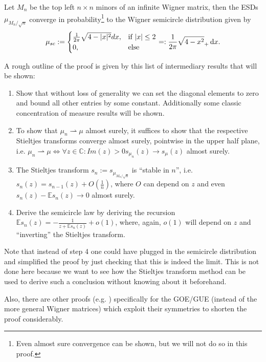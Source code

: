 \begin{theorem}\label{thm:semicircle}
	Let $M_n$ be the top left $n\times n$ minors of an infinite Wigner matrix, then the ESDs $\mu_{M_n/\sqrt{n}}$ converge in probability\footnote{Even almost sure convergence can be shown, but we will not do so in this proof.} to the Wigner semicircle distribution given by
	\begin{equation*}
		\mu_{sc}:=\begin{cases}
						\frac{1}{2\pi}\sqrt{4-|x|^2}dx, &\mbox{if } |x|\leq 2 \\
						0, &\mbox{else}
					  \end{cases}=:\frac{1}{2\pi}\sqrt{4-x^2}_+\mathop{}\!\mathrm{d} x.
	\end{equation*}
\end{theorem}
A rough outline of the proof is given by this list of intermediary results that will be shown:
\begin{enumerate}
	\item Show that without loss of generality we can set the diagonal elements to zero and bound all other entries by some constant. Additionally some classic concentration of measure results will be shown.
	\item To show that $\mu_n\rightharpoonup\mu$ almost surely, it suffices to show that the respective Stieltjes transforms converge almost surely, pointwise in the upper half plane, i.e. $\mu_n\rightharpoonup\mu\Leftrightarrow\forall z\in\mathbb C:Im(z)>0 s_{\mu_n}(z)\rightarrow s_\mu(z)$ almost surely.
	\item The Stieltjes transform $s_n := s_{\mu_{M_n/\sqrt{n}}}$ is ``stable in $n$'', i.e. $s_n(z)=s_{n-1}(z)+O(\frac{1}{n})$, where $O$ can depend on $z$ and even $s_n(z)-\mathbb E s_n(z)\rightarrow 0$ almost surely.
	\item Derive the semicircle law by deriving the recursion $\mathbb E s_n(z)=-\frac{1}{z+\mathbb E s_n(z)}+o(1)$, where, again, $o(1)$ will depend on $z$ and ``inverting'' the Stieltjes transform.
\end{enumerate}
\begin{remark}
	Note that instead of step 4 one could have plugged in the semicircle distribution and simplified the proof by just checking that this is indeed the limit. This is not done here because we want to see how the Stieltjes transform method can be used to derive such a conclusion without knowing about it beforehand.
	
	Also, there are other proofs (e.g. \cite{scGOE}) specifically for the GOE/GUE (instead of the more general Wigner matrices) which exploit their symmetries to shorten the proof considerably.
\end{remark}

